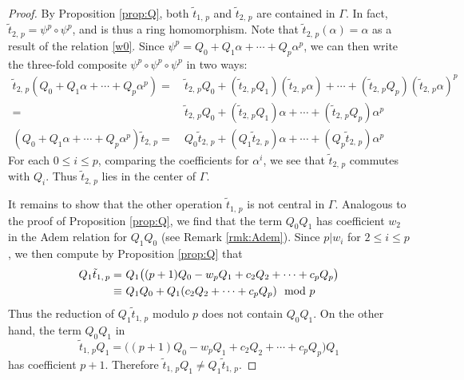 \documentclass{gtpart}
\theoremstyle{definition}
\theoremstyle{remark}
\newcommand{\md}{~~{\rm mod}~}
\newcommand{\A}{\alpha}
\newcommand{\G}{\Gamma}
\renewcommand{\=}{\approx}
\renewcommand{\-}{\sim}
\numberwithin{equation}{section}
\begin{document}
\begin{proof}
 By Proposition \ref{prop:Q}, both $\tilde{t}_{1,\,p}$ and $\tilde{t}_{2,\,p}$ 
 are contained in $\G$.  In fact, $\tilde{t}_{2,\,p} = \psi^p \circ \psi^p$, and 
 is thus a ring homomorphism.  Note that $\tilde{t}_{2,\,p}(\A) = \A$ as a 
 result of the relation \eqref{w0}.  Since 
 $\psi^p = Q_0 + Q_1 \A + \cdots + Q_p \A^p$, we can then write the three-fold 
 composite $\psi^p \circ \psi^p \circ \psi^p$ in two ways: 
 \begin{equation*}
  \begin{split}
   \tilde{t}_{2,\,p} (Q_0 + Q_1 \A + \cdots + Q_p \A^p) = 
    & ~ \tilde{t}_{2,\,p} Q_0 + (\tilde{t}_{2,\,p} Q_1) (\tilde{t}_{2,\,p} \A) 
      + \cdots + (\tilde{t}_{2,\,p} Q_p) (\tilde{t}_{2,\,p} \A)^p \\
                                                        = 
    & ~ \tilde{t}_{2,\,p} Q_0 + (\tilde{t}_{2,\,p} Q_1) \A + \cdots 
      + (\tilde{t}_{2,\,p} Q_p) \A^p \\
   (Q_0 + Q_1 \A + \cdots + Q_p \A^p) \tilde{t}_{2,\,p} = 
    & ~ Q_0 \tilde{t}_{2,\,p} + (Q_1 \tilde{t}_{2,\,p}) \A + \cdots 
      + (Q_p \tilde{t}_{2,\,p}) \A^p 
  \end{split}
 \end{equation*}
 For each $0 \leq i \leq p$, comparing the coefficients for $\A^i$, we see that 
 $\tilde{t}_{2,\,p}$ commutes with $Q_i$.  Thus $\tilde{t}_{2,\,p}$ lies in the 
 center of $\G$.  

 It remains to show that the other operation $\tilde{t}_{1,\,p}$ is not central 
 in $\G$.  Analogous to the proof of Proposition \ref{prop:Q}, we find that the 
 term $Q_0 Q_1$ has coefficient $w_2$ in the Adem relation for $Q_1 Q_0$ (see 
 Remark \ref{rmk:Adem}).  Since $p | w_i$ for $2 \leq i \leq p$, we then compute 
 by Proposition \ref{prop:Q} that 
 \begin{equation*}
  \begin{split}
   Q_1 \tilde{t}_{1,\,p} = & ~ Q_1 \big( (p + 1) Q_0 - w_p Q_1 + c_2 Q_2 
                             + \cdots + c_p Q_p \big) \\
                    \equiv & ~ Q_1 Q_0 + Q_1 (c_2 Q_2 + \cdots + c_p Q_p) \md p 
  \end{split}
 \end{equation*}
 Thus the reduction of $Q_1 \tilde{t}_{1,\,p}$ modulo $p$ does not contain 
 $Q_0 Q_1$.  On the other hand, the term $Q_0 Q_1$ in 
 \[
  \tilde{t}_{1,\,p} Q_1 = \big( (p + 1) Q_0 - w_p Q_1 + c_2 Q_2 + \cdots 
  + c_p Q_p \big) Q_1 
 \]
 has coefficient $p + 1$.  Therefore 
 $\tilde{t}_{1,\,p} Q_1 \neq Q_1 \tilde{t}_{1,\,p}$.  
\end{proof}
\end{document}
